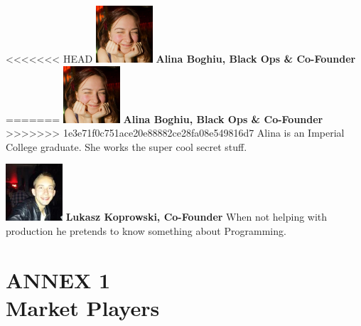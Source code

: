 \documentclass[11pt]{article}
\begin{document}
<<<<<<< HEAD
  \includegraphics[width=80px]{alina.jpg} \textbf{Alina Boghiu, Black Ops \& Co-Founder}
=======
  \includegraphics[width=80px]{alina.jpg} \textbf{Alina Boghiu, Black Ops \& Co-Founder}\\
>>>>>>> 1e3e71f0c751ace20e88882ce28fa08e549816d7
  Alina is an Imperial College graduate.
  She works the super cool secret stuff.

  \includegraphics[width=80px]{lukasz.jpg} \textbf{Lukasz Koprowski, Co-Founder}
  When not helping with production he pretends to know something about Programming.

\newpage

\section{ANNEX 1 \\ Market Players}


\newpage

\end{document}
